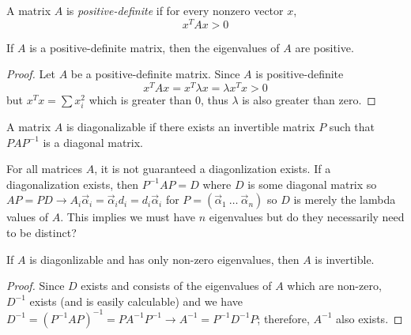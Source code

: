 \documentclass[../main.tex]{subfiles}
\begin{document}
\begin{definition}\label{def:PositiveDefinite}
A matrix $A$ is \textit{positive-definite} if for every nonzero vector $x$,
\begin{equation}
x^TAx>0
\end{equation}
\end{definition}

\begin{claim}\label{th:positiveEigen}
If $A$ is a positive-definite matrix, then the eigenvalues of $A$ are positive.
\end{claim}

\begin{proof}
Let $A$ be a positive-definite matrix. Since $A$ is positive-definite
\begin{equation*}
x^TAx = x^T\lambda x =\lambda x^Tx > 0
\end{equation*}
but $x^Tx = \sum{x_i^2}$ which is greater than $0$, thus $\lambda$ is also greater than zero.
\end{proof}

\begin{definition}[Diagonalizable]
A matrix $A$ is diagonalizable if there exists an invertible matrix $P$ such that $PAP^{-1}$ is a diagonal matrix.
\end{definition}

For all matrices $A$, it is not guaranteed a diagonlization exists. If a diagonalization exists, then $P^{-1}AP = D$ where $D$ is some diagonal matrix so $AP = PD \rightarrow A _i\vec{\alpha}_i = \vec{\alpha}_i d_i = d_i \vec{\alpha}_i$ for $P = (\vec{\alpha}_1\ \ldots\ \vec{\alpha}_n)$ so $D$ is merely the lambda values of $A$. \color{red} This implies we must have $n$ eigenvalues but do they necessarily need to be distinct?\color{black}

\begin{claim} If $A$ is diagonlizable and has only non-zero eigenvalues, then $A$ is invertible.
\end{claim}
\begin{proof}
Since $D$ exists and consists of the eigenvalues of $A$ which are non-zero, $D^{-1}$ exists (and is easily calculable) and we have $D^{-1} = (P^{-1}AP)^{-1} = PA^{-1}P^{-1} \rightarrow A^{-1} = P^{-1}D^{-1}P$; therefore, $A^{-1}$ also exists.
\end{proof}
\end{document}
